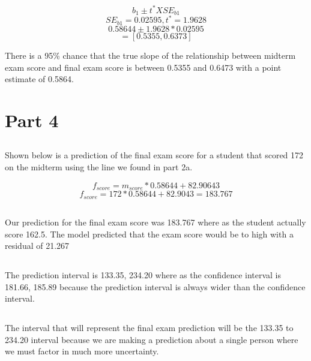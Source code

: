 \documentclass[letterpaper, onecolumn,10pt]{IEEEtran}
\begin{document}
            \[b_1 \pm t^*XSE_{b1}\]
            \[SE_{b1} = 0.02595, t^* = 1.9628\]
            \[ 0.58644 \pm 1.9628*0.02595\]
            \[= [0.5355, 0.6373]\]
            
            There is a 95\% chance that the true slope of the relationship between midterm exam score and final exam score is between 0.5355 and 0.6473 with a point estimate of 0.5864.\\
        \section{Part 4}
            \subsection{}
            Shown below is a prediction of the final exam score for a student that scored 172 on the midterm using the line we found in part 2a.
            
            \[f_{score} = m_{score}*0.58644 + 82.90643\]
            \[f_{score} = 172*0.58644 + 82.9043 = 183.767\]
            
            \subsection{}
            Our prediction for the final exam score was 183.767 where as the student actually score 162.5. The model predicted that the exam score would be to high with a residual of 21.267\\
            
            \subsection{}
            The prediction interval is 133.35, 234.20 where as the confidence interval is 181.66, 185.89 because the prediction interval is always wider than the confidence interval.\\
            
            \subsection{}
            The interval that will represent the final exam prediction will be the 133.35 to 234.20 interval because we are making a prediction about a single person where we must factor in much more uncertainty.\\
            
\end{document}
